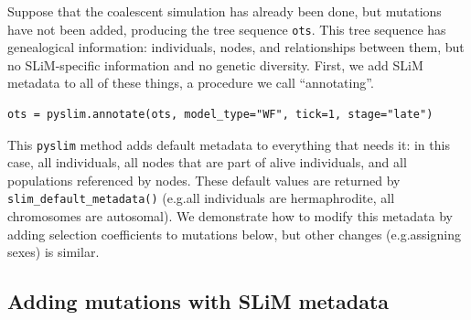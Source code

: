 \documentclass[12pt]{article}
\newcommand{\pyslim}[0]{\texttt{pyslim}\xspace}
\newcommand*{\eg}{e.g.\xcomma}
\begin{document}
Suppose that the coalescent simulation has already been done,
but mutations have not been added,
producing the tree sequence \verb|ots|.
This tree sequence has genealogical information:
individuals, nodes, and relationships between them,
but no SLiM-specific information and no genetic diversity.
First, we add SLiM metadata to all of these things, a procedure we call ``annotating''.
\begin{listing}[H]
  \begin{verbatim}
ots = pyslim.annotate(ots, model_type="WF", tick=1, stage="late")
  \end{verbatim}
\end{listing}
This \pyslim method adds default metadata to everything that needs it:
in this case, all individuals, all nodes that are part of alive individuals,
and all populations referenced by nodes.
These default values are returned by \verb|slim_default_metadata()|
(\eg all individuals are hermaphrodite, all chromosomes are autosomal).
We demonstrate how to modify this metadata by adding selection coefficients to mutations below,
but other changes (\eg assigning sexes) is similar.

\subsection*{Adding mutations with SLiM metadata}
\end{document}
